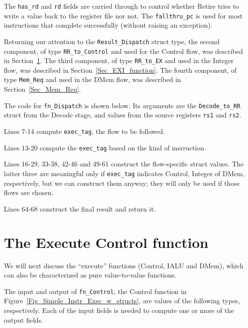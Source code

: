 The \verb|has_rd| and \verb|rd| fields are carried through to control
whether Retire tries to write a value back to the register file nor
not.  The \verb|fallthru_pc| is used for most instructions that
complete successfully (without raising an exception).

Returning our attention to the \verb|Result_Dispatch| struct type, the
second component, of type \verb|RR_to_Control| and used for the
Control flow, was described in Section~\ref{Sec_Control_function}. The
third component, of type \verb|RR_to_EX| and used in the Integer flow,
was described in Section~\ref{Sec_EXI_function}.  The fourth
component, of type \verb|Mem_Req| and used in the DMem flow, was
described in Section~\ref{Sec_Mem_Req}.

The code for \verb|fn_Dispatch| is shown below.  Its arguments are the
\verb|Decode_to_RR| struct from the Decode stage, and values from the
source registers \verb|rs1| and \verb|rs2|.



Lines 7-14 compute \verb|exec_tag|, {\ie} the flow to be followed.



Lines 13-20 compute the \verb|exec_tag| based on the kind of
insrruction.

Lines 16-29, 33-38, 42-46 and 49-61 construct the flow-specific struct
values.  The latter three are meaningful only if \verb|exec_tag|
indicates Control, Integer of DMem, respectively, but we can construct
them anyway; they will only be used if those flows are chosen.

Lines 64-68 construct the final result and return it.


\section{The Execute Control function}

\label{Sec_Control_function}


We will next discuss the ``execute'' functions (Control, IALU and
DMem), which can also be characterized as pure value-to-value
functions.

The input and output of \verb|fn_Control|, the Control function in
Figure~\ref{Fig_Simple_Instr_Exec_w_structs}, are values of the
following types, respectively.  Each of the input fields is needed to
compute one or more of the output fields.

